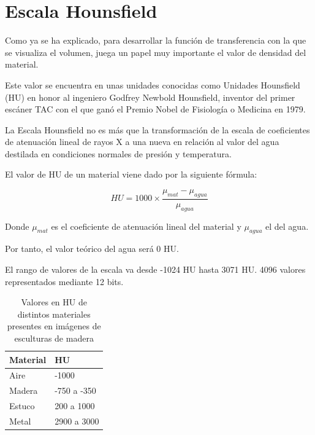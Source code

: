 \section{Escala Hounsfield}

Como ya se ha explicado, para desarrollar la función de transferencia con la que se visualiza el volumen, juega un papel muy importante el valor de densidad del material. 

Este valor se encuentra en unas unidades conocidas como Unidades Hounsfield (HU) en honor al ingeniero Godfrey Newbold Hounsfield, inventor del primer escáner TAC con el que ganó el Premio Nobel de Fisiología o Medicina en 1979.

La Escala Hounsfield no es más que la transformación de la escala de coeficientes de atenuación lineal de rayos X a una nueva en relación al valor del agua destilada en condiciones normales de presión y temperatura.

El valor de HU de un material viene dado por la siguiente fórmula:

\[ HU = 1000 \times \frac{\mu_{mat}-\mu_{agua}}{\mu_{agua}} \]

Donde $ \mu_{mat} $ es el coeficiente de atenuación lineal del material y $ \mu_{agua} $ el del agua.

Por tanto, el valor teórico del agua será 0 HU.

El rango de valores de la escala va desde -1024 HU hasta 3071 HU. 4096 valores representados mediante 12 bits.

\begin{table}[H]
	\begin{center}
		\begin{tabular} {|l|l|}
			\hline
			Material & HU \\ \hline
			\hline
			Aire & -1000 \\ \hline
			Madera & -750 a -350 \\ \hline
			Estuco & 200 a 1000 \\ \hline
			Metal & 2900 a 3000 \\ \hline
		\end{tabular}
		\caption{Valores en HU de distintos materiales presentes en imágenes de esculturas de madera}
		\label{tab:materials_hu}
	\end{center}
\end{table}
